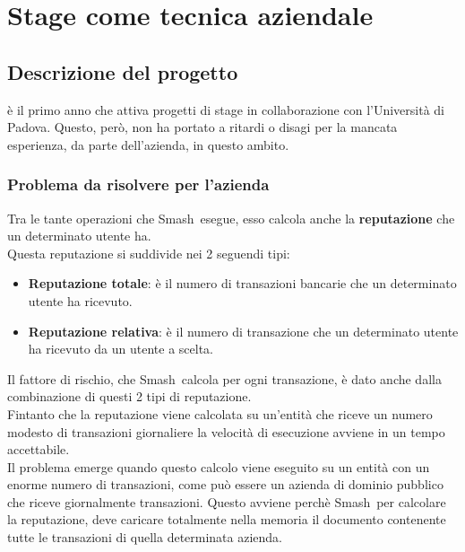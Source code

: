 
\chapter{Stage come tecnica aziendale}
\label{cap:tecnica-stage}

\section{Descrizione del progetto}
\label{sec:prob}
\textit{\azienda} è il primo anno che attiva progetti di stage in collaborazione con l'Università di Padova. Questo, però, non ha portato a ritardi o disagi per la mancata esperienza, da parte dell'azienda, in questo ambito. 
\subsection{Problema da risolvere per l'azienda}
Tra le tante operazioni che Smash\textregistered\ esegue, esso calcola anche la \textbf{reputazione} che un determinato utente ha.\\
Questa reputazione si suddivide nei 2 seguendi tipi:
\begin{itemize}
\item{\textbf{Reputazione totale}:} è il numero di transazioni bancarie che un determinato utente ha ricevuto.
\item{\textbf{Reputazione relativa}:} è il numero di transazione che un determinato utente ha ricevuto da un utente a scelta.
\end{itemize}
Il fattore di rischio, che Smash\textregistered\ calcola per ogni transazione, è dato anche dalla combinazione di questi 2 tipi di reputazione.\\
Fintanto che la reputazione viene calcolata su un'entità che riceve un numero modesto di transazioni giornaliere la velocità di esecuzione avviene in un tempo accettabile. 
\\Il problema emerge quando questo calcolo viene eseguito su un entità con un enorme numero di transazioni, come può essere un azienda di dominio pubblico che riceve giornalmente transazioni. Questo avviene perchè Smash\textregistered\, per calcolare la reputazione, deve caricare totalmente nella memoria il documento contenente tutte le transazioni di quella determinata azienda.
